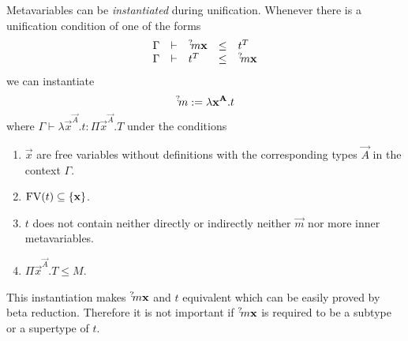 Metavariables can be \emph{instantiated} during unification. Whenever there is a
unification condition of one of the forms
$$
\begin{array}{lllll}
    \Gamma &\vdash &{{}^? \kern-0.2em m} {\mathbf x} &\le &t^T
    \\
    \Gamma &\vdash &t^T &\le &{{}^? \kern-0.2em m} {\mathbf x}
\end{array}
$$
we can instantiate
$$
    {{}^? \kern-0.2em m} := \lambda {\mathbf x} ^{{\mathbf A}}. t
$$
where $\Gamma \vdash \lambda \vec x^{\vec A}. t : \Pi \vec x^{\vec A}. T$ under
the conditions
\begin{enumerate}

    \item $\vec x$ are free variables without definitions with the corresponding
        types $\vec A$ in the context $\Gamma$.

    \item $\text{FV}(t) \subseteq {\{{\mathbf x}\}}$.

    \item $t$ does not contain neither directly or indirectly neither $\vec m$
        nor more inner metavariables.

    \item $\Pi \vec x^{\vec A}. T \le M$.
\end{enumerate}

This instantiation makes ${{}^? \kern-0.2em m} {\mathbf x}$ and $t$ equivalent which can be easily
proved by beta reduction. Therefore it is not important if
${{}^? \kern-0.2em m} {\mathbf x}$ is required to be a subtype or a supertype of $t$.
